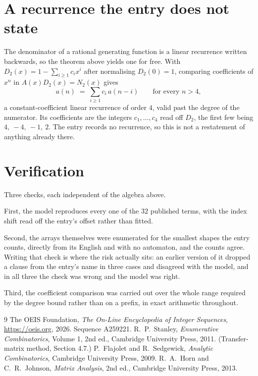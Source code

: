 \documentclass[11pt,a4paper]{article}
\theoremstyle{plain}
\theoremstyle{definition}
\begin{document}
\section{A recurrence the entry does not state}

The denominator of a rational generating function is a linear recurrence written backwards, so
the theorem above yields one for free. With $D_2(x)=1-\sum_{i\ge1}c_ix^i$ after normalising
$D_2(0)=1$, comparing coefficients of $x^n$ in $A(x)D_2(x)=N_2(x)$ gives
\[
a(n)\;=\;\sum_{i\ge1}c_i\,a(n-i)\qquad\text{for every }n>4,
\]
a constant-coefficient linear recurrence of order $4$, valid past the degree of the
numerator. Its coefficients are the integers $c_1,\dots,c_{4}$ read off $D_2$, the first few being $4,\ -4,\ -1,\ 2$. The entry records no recurrence, so this is not a restatement of anything
already there.

\section{Verification}

Three checks, each independent of the algebra above.

First, the model reproduces every one of the $32$ published terms, with the index shift
read off the entry's offset rather than fitted.

Second, the arrays themselves were enumerated for the smallest shapes the entry counts,
directly from its English and with no automaton, and the counts agree. Writing that check is
where the risk actually sits: an earlier version of it dropped a clause from the entry's name
in three cases and disagreed with the model, and in all three the check was wrong and the model
was right.

Third, the coefficient comparison was carried out over the whole range required by the degree
bound rather than on a prefix, in exact arithmetic throughout.

\begin{thebibliography}{9}
 The OEIS Foundation, \emph{The On-Line Encyclopedia of Integer
Sequences}, \url{https://oeis.org}, 2026. Sequence A259221.
 R.~P.~Stanley, \emph{Enumerative Combinatorics}, Volume 1, 2nd ed.,
Cambridge University Press, 2011. (Transfer-matrix method, Section 4.7.)
 P.~Flajolet and R.~Sedgewick, \emph{Analytic Combinatorics}, Cambridge
University Press, 2009.
 R.~A.~Horn and C.~R.~Johnson, \emph{Matrix Analysis}, 2nd ed., Cambridge
University Press, 2013.
\end{thebibliography}
\end{document}
